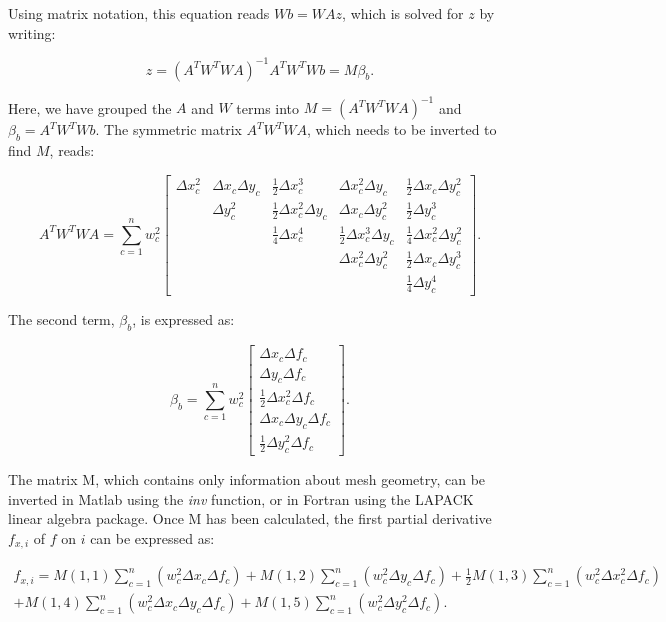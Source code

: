 \documentclass{article}
\begin{document}
Using matrix notation, this equation reads $Wb = WAz$, which is solved for $z$ by writing:

\begin{equation} \label{eq:disc_LSmatrix2}
z = {\left( A^T W^T W A \right)}^{-1} A^T W^T W b = M \beta_b.
\end{equation}

Here, we have grouped the $A$ and $W$ terms into $M = {\left( A^T W^T W A \right)}^{-1}$ and $\beta_b = A^T W^T W b$. The symmetric matrix $A^T W^T W A$, which needs to be inverted to find $M$, reads:

\begin{equation} \label{eq:disc_LSATWTWA}
A^T W^T W A = \sum_{c=1}^n w_c^2
\begin{bmatrix}
\Delta x_c^2 & \Delta x_c \Delta y_c & \frac12 \Delta x_c^3 & \Delta x_c^2 \Delta y_c & \frac12 \Delta x_c \Delta y_c^2 \\
 & \Delta y_c^2 & \frac12 \Delta x_c^2 \Delta y_c & \Delta x_c \Delta y_c^2 & \frac12 \Delta y_c^3 \\ 
 & & \frac14 \Delta x_c^4 & \frac12 \Delta x_c^3 \Delta y_c & \frac14 \Delta x_c^2 \Delta y_c^2 \\ 
 & & & \Delta x_c^2 \Delta y_c^2 & \frac12 \Delta x_c \Delta y_c^3 \\
 & & & & \frac14 \Delta y_c^4
\end{bmatrix}.
\end{equation}

The second term, $\beta_b$, is expressed as:

\begin{equation} \label{eq:disc_LSbetab}
\beta_b = \sum_{c=1}^n w_c^2
\begin{bmatrix}
\Delta x_c \Delta f_c \\ \Delta y_c \Delta f_c \\ \frac12 \Delta x_c^2 \Delta f_c \\ \Delta x_c \Delta y_c \Delta f_c \\ \frac12 \Delta y_c^2 \Delta f_c
\end{bmatrix}.
\end{equation}

The matrix M, which contains only information about mesh geometry, can be inverted in Matlab using the \textit{inv} function, or in Fortran using the LAPACK linear algebra package. Once M has been calculated, the first partial derivative $f_{x,i}$ of $f$ on $i$ can be expressed as:

\begin{multline} \label{eq:disc_LSfxifyi}
f_{x,i} = M(1,1) \sum_{c=1}^n \left( w_c^2 \Delta x_c \Delta f_c \right) + 
             M(1,2) \sum_{c=1}^n \left( w_c^2 \Delta y_c \Delta f_c \right) + 
             \frac12 M(1,3) \sum_{c=1}^n \left( w_c^2 \Delta x_c^2 \Delta f_c \right) 
             \\ + M(1,4) \sum_{c=1}^n \left( w_c^2 \Delta x_c \Delta y_c \Delta f_c \right) +  
             M(1,5) \sum_{c=1}^n \left( w_c^2 \Delta y_c^2 \Delta f_c \right).
\end{multline}
\end{document}
